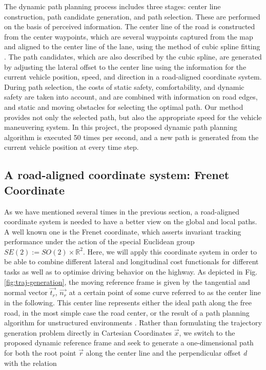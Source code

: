 The dynamic path planning process includes three stages: center line construction, path candidate generation, and path selection. These are performed on the basis of perceived information. The center line of the road is constructed from the center waypoints, which are several waypoints captured from the map and aligned to the center line of the lane, using the method of cubic spline fitting \cite{Frenet2008}. The path candidates, which are also described by the cubic spline, are generated by adjusting the lateral offset to the center line using the information for the current vehicle position, speed, and direction in a road-aligned coordinate system. During path selection, the costs of static safety, comfortability, and dynamic safety are taken into account, and are combined with information on road edges, and static and moving obstacles for selecting the optimal path. Our method provides not only the selected path, but also the appropriate speed for the vehicle maneuvering system. In this project, the proposed dynamic path planning algorithm is executed 50 times per second, and a new path is generated from the current vehicle position at every time step. 

\subsection{A road-aligned coordinate system: Frenet Coordinate}

As we have mentioned several times in the previous section, a road-aligned coordinate system is needed to have a better view on the global and local paths. A well known one is the Frenet coordinate, which asserts invariant tracking performance under the action of the special Euclidean group $SE(2) := SO(2) \times \mathbb{R}^2$. Here, we will apply this coordinate system in order to be able to combine different lateral and longitudinal cost functionals for different tasks as well as to optimise driving behavior on the highway. As depicted in Fig. \ref{fig:traj-generation}, the moving reference frame is given by the tangential and normal vector $\overrightarrow{t_r}$, $\overrightarrow{n_r}$ at a certain point of some curve referred to as the center line in the following. This center line represents either the ideal path along the free road, in the most simple case the road center, or the result of a path planning algorithm for unstructured environments \cite{Frenet2008}. Rather than formulating the trajectory generation problem directly in Cartesian Coordinates $\overrightarrow{x}$, we switch to the proposed dynamic reference frame and seek to generate a one-dimensional path for both the root point $\overrightarrow{r}$ along the center line and the perpendicular offset \textit{d} with the relation

